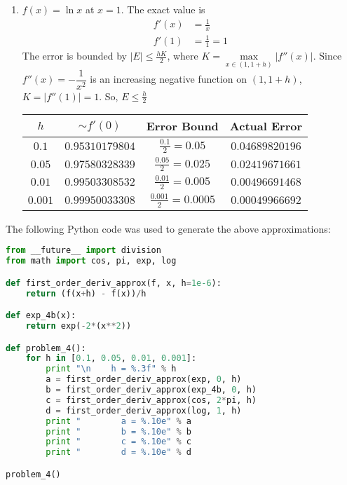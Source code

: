 \documentclass[12pt]{article}
\begin{document}
\begin{enumerate}[\ \ (a)\ \ ]
\begin{table}[H]
\begin{tabular}{||c|c|c|c||}
        \end{tabular}
    \end{table}
    \item $f(x) = \ln{x}$ at $x = 1$.  The exact value is
    \begin{align*}
        f'(x) &= \frac{1}{x} \\
        f'(1) &= \frac{1}{1} = 1
    \end{align*}
    The error is bounded by $|E| \leq \displaystyle\frac{hK}{2}$, where $K = \max\limits_{x\in(1, 1 + h)}\left|f''(x)\right|$.  Since $f''(x) = -\dfrac{1}{x^2}$ is an increasing negative function on $(1, 1 + h)$, $K = |f''(1)| = 1$.  So, $E \leq \displaystyle\frac{h}{2}$
    \begin{table}[H]
        \begin{tabular}{||c|c|c|c||} \hline\hline
            $h$ & $\sim f'(0)$ & {\bf Error Bound} & {\bf Actual Error} \\ \hline
            $0.1$ & $0.95310179804$ & $\frac{0.1}{2} = 0.05$ & $0.04689820196$ \\ \hline
            $0.05$ & $0.97580328339$ & $\frac{0.05}{2} = 0.025$ & $0.02419671661$ \\ \hline
            $0.01$ & $0.99503308532$ & $\frac{0.01}{2} = 0.005$ & $0.00496691468$ \\ \hline
            $0.001$ & $0.99950033308$ & $\frac{0.001}{2} = 0.0005$ & $0.00049966692$ \\ \hline \hline
        \end{tabular}
    \end{table}

\end{enumerate}
The following Python code was used to generate the above approximations:
\begin{lstlisting}[language=Python, caption=Problem 3 source code]
from __future__ import division
from math import cos, pi, exp, log

def first_order_deriv_approx(f, x, h=1e-6):
    return (f(x+h) - f(x))/h

def exp_4b(x):
    return exp(-2*(x**2))

def problem_4():
    for h in [0.1, 0.05, 0.01, 0.001]:
        print "\n    h = %.3f" % h
        a = first_order_deriv_approx(exp, 0, h)
        b = first_order_deriv_approx(exp_4b, 0, h)
        c = first_order_deriv_approx(cos, 2*pi, h)
        d = first_order_deriv_approx(log, 1, h)
        print "        a = %.10e" % a
        print "        b = %.10e" % b
        print "        c = %.10e" % c
        print "        d = %.10e" % d

problem_4()
\end{lstlisting}
\end{document}
